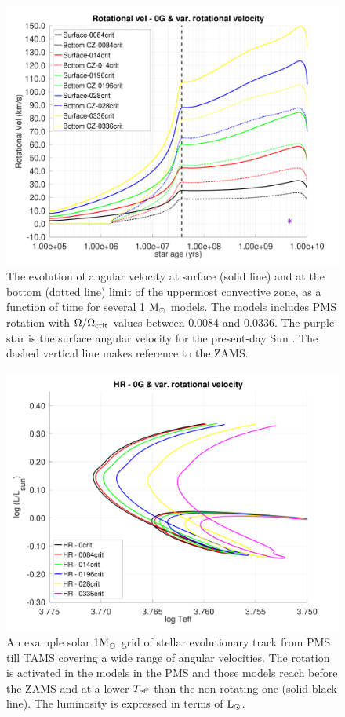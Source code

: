 \documentclass[fleqn,usenatbib]{mnras}
\begin{document}
\begin{figure}
	\includegraphics[trim = 10mm 10mm 15mm 10mm clip,width=\columnwidth]{figures/paper1/rot_vel_var_vel_0_0g.pdf}
    \caption{The evolution of angular velocity at surface (solid line) and at the bottom (dotted line) limit of the uppermost convective zone, as a function of time for several 1 $\mathrm{M}_\odot$ models. The models includes PMS rotation with $\Omega / \Omega_{\mathrm{crit}}$ values between 0.0084 and 0.0336. The purple star is the surface angular velocity for the present-day Sun \citep{Gill2012}. The dashed vertical line makes reference to the ZAMS.}
    \label{fig:rot_vel_0g}
\end{figure}


\begin{figure}
	\includegraphics[trim = 10mm 10mm 15mm 10mm, clip,width=\columnwidth]{figures/paper1/hr_var_vel_0_0g_z1.pdf}
    \caption{An example solar 1$\mathrm{M}_\odot$ grid of stellar evolutionary track from PMS till TAMS covering a wide range of angular velocities. The rotation is activated in the models in the PMS and those models reach before the ZAMS and at a lower $T_{\mathrm{eff}}$ than the non-rotating one (solid black line). The luminosity is expressed in terms of $\mathrm{L}_\odot$.}
    \label{fig:hr_var_vel_0g}
\end{figure}
\end{document}
